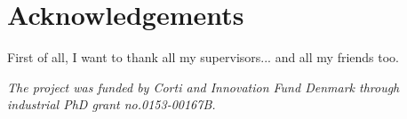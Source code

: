 \chapter[acknowledgements]{Acknowledgements}
First of all, I want to thank all my supervisors... and all my friends too.








\vspace*{\fill}
\noindent \textit{The project was funded by Corti and Innovation Fund Denmark through industrial PhD grant no.\@ 0153-00167B.}
